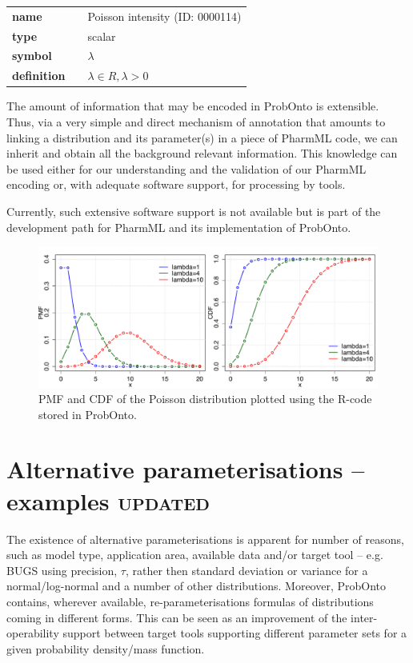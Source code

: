 {\noindent\begin{tabular}{p{2cm}cl}
\textbf{name} & & Poisson intensity  (ID: 0000114) \\
\textbf{type} & & scalar \\
\textbf{symbol} & & $\lambda$  \\
\textbf{definition} & & $\lambda \in R, \lambda > 0$
\end{tabular}
\bigskip 

The amount of information that may be encoded in ProbOnto is extensible. 
Thus,  via a very simple and direct mechanism of annotation that amounts to 
linking a distribution and its parameter(s) in a piece of PharmML code, we can
 inherit and obtain all the background relevant information. 
 This knowledge can be used either for our understanding and the validation of 
 our PharmML encoding or, with adequate software support, for processing by 
 tools. 
 
Currently, such extensive software support is not available but is part of the 
development path for PharmML and its implementation of ProbOnto. 

\begin{figure}[htb!]
\centering
  \includegraphics[width=140mm]{pics/Poisson.pdf}
 \caption{PMF and CDF of the Poisson distribution plotted using the R-code
 stored in ProbOnto.}
 \label{fig:PoissonExample}
\end{figure}


\section{Alternative parameterisations -- examples {\color{red} \scshape{updated}}}
\label{sec:altParams}
The existence of alternative parameterisations is apparent for number of reasons, 
such as model type, application area, available data and/or target tool -- e.g. BUGS using 
precision, $\tau$, rather then standard deviation or variance for a normal/log-normal
and a number of other distributions. Moreover, ProbOnto contains, wherever available, 
re-parameterisations formulas of distributions coming in different forms. 
This can be seen as an improvement of the inter-operability support between target 
tools supporting different parameter sets for a given probability density/mass function.

}
